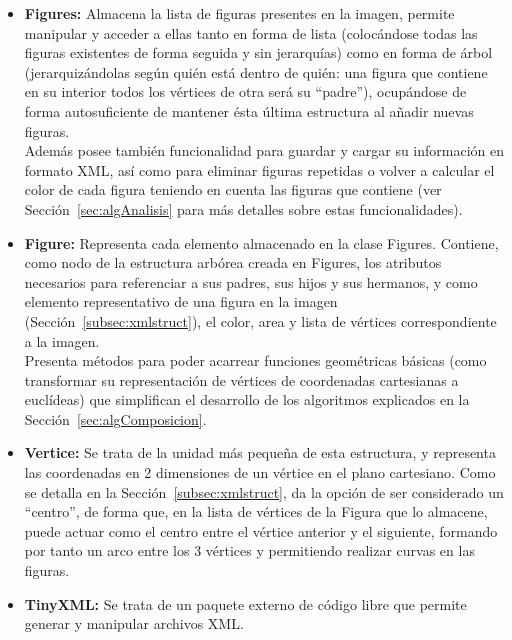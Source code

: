 	\begin{itemize}
	
		\item \textbf{Figures:} Almacena la lista de figuras presentes en la imagen, permite manipular y acceder a ellas tanto en forma de lista (colocándose todas las figuras existentes de forma seguida y sin jerarquías) como en forma de árbol (jerarquizándolas según quién está dentro de quién: una figura que contiene en su interior todos los vértices de otra será su ``padre''), ocupándose de forma autosuficiente de mantener ésta última estructura al añadir nuevas figuras.\\

		Además posee también funcionalidad para guardar y cargar su información en formato XML, así como para eliminar figuras repetidas o volver a calcular el color de cada figura teniendo en cuenta las figuras que contiene (ver Sección~\ref{sec:algAnalisis} para más detalles sobre estas funcionalidades).
		
		\item \textbf{Figure:} Representa cada elemento almacenado en la clase Figures. Contiene, como nodo de la estructura arbórea creada en Figures, los atributos necesarios para referenciar a sus padres, sus hijos y sus hermanos, y como elemento representativo de una figura en la imagen (Sección~\ref{subsec:xmlstruct}), el color, area y lista de vértices correspondiente a la imagen.\\
		
		Presenta métodos para poder acarrear funciones geométricas básicas (como transformar su representación de vértices de coordenadas cartesianas a euclídeas) que simplifican el desarrollo de los algoritmos explicados en la Sección~\ref{sec:algComposicion}.
		
		\item \textbf{Vertice:} Se trata de la unidad más pequeña de esta estructura, y representa las coordenadas en 2 dimensiones de un vértice en el plano cartesiano. Como se detalla en la Sección~\ref{subsec:xmlstruct}, da la opción de ser considerado un ``centro'', de forma que, en la lista de vértices de la Figura que lo almacene, puede actuar como el centro entre el vértice anterior y el siguiente, formando por tanto un arco entre los 3 vértices y permitiendo realizar curvas en las figuras.
		
		\item \textbf{TinyXML:} Se trata de un paquete externo de código libre que permite generar y manipular archivos XML.
	
	\end{itemize}
	
